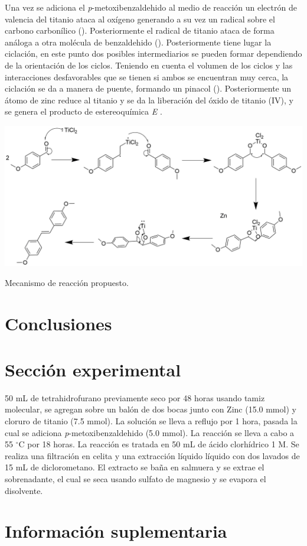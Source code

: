 \documentclass[fleqn,10pt]{SelfArx}
\begin{document}
Una vez se adiciona el \textit{p}-metoxibenzaldehido al medio de reacci\'on un electr\'on de valencia del titanio ataca al ox\'igeno generando a su vez un radical sobre el carbono carbon\'ilico (). Posteriormente el radical de titanio ataca de forma an\'aloga a otra mol\'ecula de benzaldehido (). Posteriormente tiene lugar la ciclaci\'on, en este punto dos posibles intermediarios se pueden formar dependiendo de la orientaci\'on de los ciclos. Teniendo en cuenta el volumen de los ciclos y las interacciones desfavorables que se tienen si ambos se encuentran muy cerca, la ciclaci\'on se da a manera de puente, formando un pinacol (). Posteriormente un \'atomo de zinc reduce al titanio y se da la liberaci\'on del \'oxido de titanio (IV), y se genera el producto de estereoqu\'imica \textit{E} \cite{richards2001}.
\begin{scheme}[h]
	\centering
	\includegraphics[width = \linewidth]{structures/mechanism.png}
	\caption{Mecanismo de reacci\'on propuesto.}
\end{scheme}

\section{Conclusiones}
\section{Secci\'on experimental}
50 mL de tetrahidrofurano previamente seco por 48 horas usando tamiz molecular, se agregan sobre un bal\'on de dos bocas junto con Zinc (15.0 mmol) y cloruro de titanio (7.5 mmol). La soluci\'on se lleva a reflujo por 1 hora, pasada la cual se adiciona \textit{p}-metoxibenzaldehido (5.0 mmol). La reacci\'on se lleva a cabo a 55 $^\circ$C por 18 horas. La reacci\'on es tratada en 50 mL de \'acido clorh\'idrico 1 M. Se realiza una filtraci\'on en celita y una extracci\'on l\'iquido l\'iquido con dos lavados de 15 mL de diclorometano. El extracto se baña en salmuera y se extrae el sobrenadante, el cual se seca usando sulfato de magnesio y se evapora el disolvente.



\newpage
\onecolumn
\section{Informaci\'on suplementaria}\label{sec: complementaria}
\end{document}
